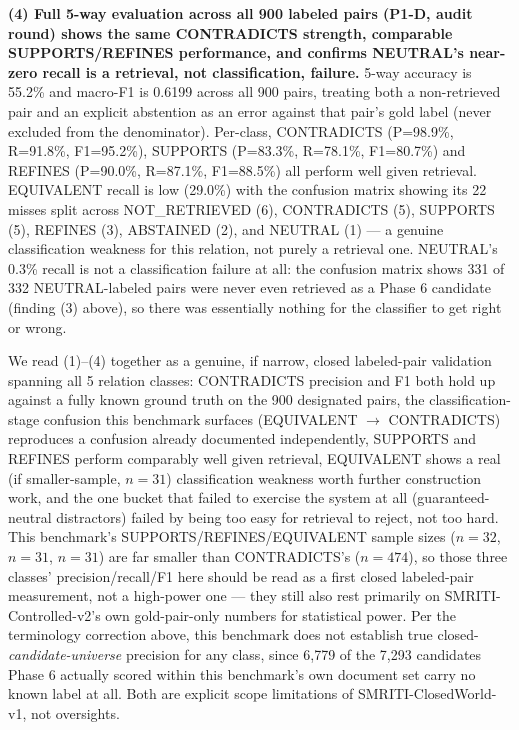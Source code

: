 

\textbf{(4) Full 5-way evaluation across all 900 labeled pairs (P1-D,
audit round) shows the same CONTRADICTS strength, comparable
SUPPORTS/REFINES performance, and confirms NEUTRAL's near-zero recall is
a retrieval, not classification, failure.} 5-way accuracy is 55.2\% and
macro-F1 is 0.6199 across all 900 pairs, treating both a non-retrieved
pair and an explicit abstention as an error against that pair's gold
label (never excluded from the denominator). Per-class, CONTRADICTS
(P=98.9\%, R=91.8\%, F1=95.2\%), SUPPORTS (P=83.3\%, R=78.1\%, F1=80.7\%)
and REFINES (P=90.0\%, R=87.1\%, F1=88.5\%) all perform well given
retrieval. EQUIVALENT recall is low (29.0\%) with the confusion matrix
showing its 22 misses split across NOT\_RETRIEVED (6), CONTRADICTS (5),
SUPPORTS (5), REFINES (3), ABSTAINED (2), and NEUTRAL (1) --- a genuine
classification weakness for this relation, not purely a retrieval one.
NEUTRAL's 0.3\% recall is not a classification failure at all: the
confusion matrix shows 331 of 332 NEUTRAL-labeled pairs were never even
retrieved as a Phase 6 candidate (finding (3) above), so there was
essentially nothing for the classifier to get right or wrong.

We read (1)--(4) together as a genuine, if narrow, closed labeled-pair
validation spanning all 5 relation classes: CONTRADICTS precision and F1
both hold up against a fully known ground truth on the 900 designated
pairs, the classification-stage confusion this benchmark surfaces
(EQUIVALENT $\to$ CONTRADICTS) reproduces a confusion already documented
independently, SUPPORTS and REFINES perform comparably well given
retrieval, EQUIVALENT shows a real (if smaller-sample, $n=31$)
classification weakness worth further construction work, and the one
bucket that failed to exercise the system at all (guaranteed-neutral
distractors) failed by being too easy for retrieval to reject, not too
hard. This benchmark's SUPPORTS/REFINES/EQUIVALENT sample sizes ($n=32$,
$n=31$, $n=31$) are far smaller than CONTRADICTS's ($n=474$), so those
three classes' precision/recall/F1 here should be read as a
first closed labeled-pair measurement, not a high-power one --- they
still also rest primarily on SMRITI-Controlled-v2's own gold-pair-only
numbers for statistical power. Per the terminology correction above,
this benchmark does not establish true closed-\emph{candidate-universe}
precision for any class, since 6{,}779 of the 7{,}293 candidates Phase 6
actually scored within this benchmark's own document set carry no known
label at all. Both are explicit scope limitations of
SMRITI-ClosedWorld-v1, not oversights.

